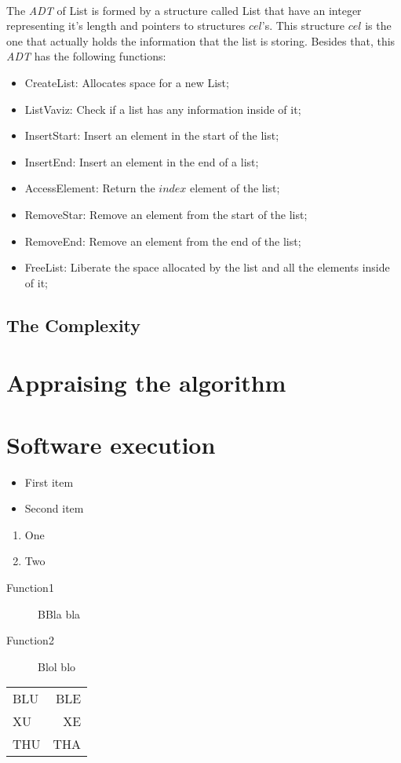 \documentclass[titlepage]{article}
\begin{document}
        \paragraph{}
        The \emph{ADT} of List is formed by a structure called List that have an integer representing it's length and pointers to structures $cel$'s. This structure $cel$ is the one that actually holds the information that the list is storing. Besides that, this \emph{ADT} has the following functions:
        \begin{itemize}
            \item CreateList: Allocates space for a new List;
            \item ListVaviz: Check if a list has any information inside of it;
            \item InsertStart: Insert an element in the start of the list;
            \item InsertEnd: Insert an element in the end of a list;
            \item AccessElement: Return the $index$ element of the list;
            \item RemoveStar: Remove an element from the start of the list;
            \item RemoveEnd: Remove an element from the end of the list;
            \item FreeList: Liberate the space allocated by the list and all the elements inside of it; 
        \end{itemize}
        \subsection{The Complexity}
    \section{Appraising the algorithm}
    \section{Software execution}
    
    \begin{itemize}
        \item First item
        \item Second item
    \end{itemize}

    \begin{enumerate}
        \item One
        \item Two
    \end{enumerate}

    \begin{description}
        \item[Function1] BBla bla
        \item[Function2] Blol blo 
    \end{description}
    
    \begin{tabular}{lr}
        BLU & BLE\\
        XU & XE\\
        THU & THA\\
    \end{tabular}
\end{document}
